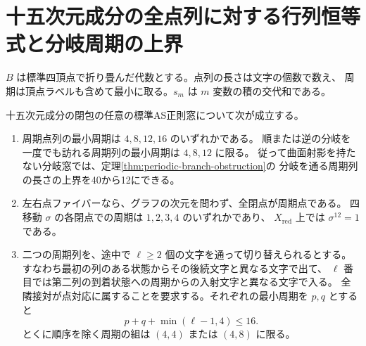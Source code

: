 \section{十五次元成分の全点列に対する行列恒等式と分岐周期の上界}
\label{sec:pi-periodic-point-paths}
$B$ は標準四頂点で折り畳んだ代数とする。点列の長さは文字の個数で数え、
周期は頂点ラベルも含めて最小に取る。$s_m$ は $m$ 変数の積の交代和である。
\begin{theorem}\label{thm:pi-periodic-point-paths}
十五次元成分の閉包の任意の標準AS正則窓について次が成立する。
\begin{enumerate}
\item 周期点列の最小周期は $4,8,12,16$ のいずれかである。
順または逆の分岐を一度でも訪れる周期列の最小周期は $4,8,12$ に限る。
従って曲面射影を持たない分岐窓では、定理\ref{thm:periodic-branch-obstruction}の
分岐を通る周期列の長さの上界を40から12にできる。
\item 左右点ファイバーなら、グラフの次元を問わず、全閉点が周期点である。
四移動 $\sigma$ の各閉点での周期は $1,2,3,4$ のいずれかであり、
$X_{\mathrm{red}}$ 上では $\sigma^{12}=1$ である。
\item 二つの周期列を、途中で $\ell\ge2$ 個の文字を通って切り替えられるとする。
すなわち最初の列のある状態からその後続文字と異なる文字で出て、
$\ell$ 番目では第二列の到着状態への周期からの入射文字と異なる文字で入る。
全隣接対が点対応に属することを要求する。それぞれの最小周期を $p,q$ とすると
\[
                 p+q+\min(\ell-1,4)\le16 .
\]
とくに順序を除く周期の組は $(4,4)$ または $(4,8)$ に限る。
\end{enumerate}
\end{theorem}
